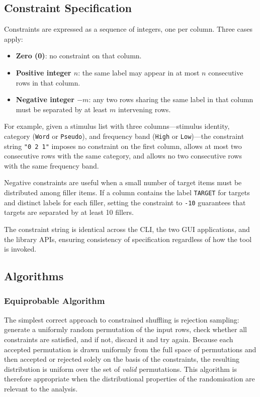 \documentclass[doc,a4paper,biblatex]{apa7}
\begin{document}
\subsection{Constraint Specification}
\label{sec:constraints}

Constraints are expressed as a sequence of integers, one per column.
Three cases apply:

\begin{itemize}
  \item \textbf{Zero (0)}: no constraint on that column.
  \item \textbf{Positive integer $n$}: the same label may appear in at
    most $n$ consecutive rows in that column.
  \item \textbf{Negative integer $-m$}: any two rows sharing the same
    label in that column must be separated by at least $m$ intervening
    rows.
\end{itemize}

For example, given a stimulus list with three columns---stimulus identity,
category (\texttt{Word} or \texttt{Pseudo}), and frequency band
(\texttt{High} or \texttt{Low})---the constraint string \texttt{"0 2 1"}
imposes no constraint on the first column, allows at most two consecutive
rows with the same category, and allows no two consecutive rows with the
same frequency band.

Negative constraints are useful when a small number of target items must
be distributed among filler items. If a column contains the label
\texttt{TARGET} for targets and distinct labels for each filler, setting
the constraint to \texttt{-10} guarantees that targets are separated by at
least 10 fillers.

The constraint string is identical across the CLI, the two GUI
applications, and the library APIs, ensuring consistency of specification
regardless of how the tool is invoked.

\subsection{Algorithms}
\label{sec:algorithms}

\subsubsection{Equiprobable Algorithm}

The simplest correct approach to constrained shuffling is rejection
sampling: generate a uniformly random permutation of the input rows,
check whether all constraints are satisfied, and if not, discard it and
try again. Because each accepted permutation is drawn uniformly from the
full space of permutations and then accepted or rejected solely on the
basis of the constraints, the resulting distribution is uniform over the
set of \textit{valid} permutations. This algorithm is therefore
appropriate when the distributional properties of the randomisation are
relevant to the analysis.
\end{document}
